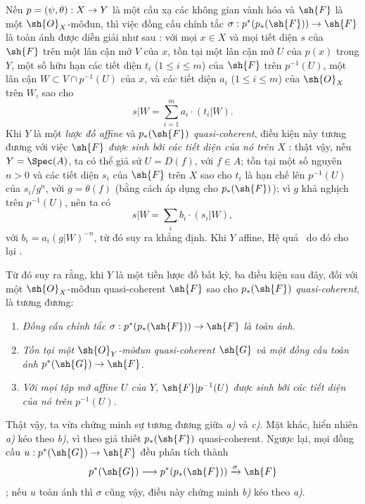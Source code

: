 \documentclass[oneside,10pt]{amsart}
\makeatletter
\renewcommand{\leq}{\leqslant}
\newcommand{\ega@arrow}[2]{\mathchoice{#1}{#2}{#2}{#2}}
\renewcommand{\to}{\ega@arrow{\longrightarrow}{\rightarrow}}
\newcommand{\oldpage}[2][]{\marginnote{\normalfont\footnotesize\textbf{#1}~|~#2}\ignorespaces}
\let\EGAOriginalLabel\label
\renewcommand{\label}[1]{\phantomsection\EGAOriginalLabel{#1}}
\makeatother
\begin{document}
\begin{remarks}[3.4.7]
\label{II.3.4.7}
Nếu $p=(\psi,\theta):X\to Y$ là một cấu xạ các không gian vành hóa và $\sh{F}$ là một $\sh{O}_X$-môđun, thì việc đồng cấu chính tắc $\sigma:p^*(p_*(\sh{F}))\to\sh{F}$ là toàn ánh được diễn giải như sau : với mọi $x\in X$ và mọi tiết diện $s$ của $\sh{F}$ trên một lân cận mở $V$ của $x$, tồn tại một lân cận mở $U$ của $p(x)$ trong $Y$, một số hữu hạn các tiết diện $t_i$ ($1\leq i\leq m$) của $\sh{F}$ trên $p^{-1}(U)$, một lân cận $W\subset V\cap p^{-1}(U)$ của $x$, và các tiết diện $a_i$ ($1\leq i\leq m$) của $\sh{O}_X$ trên $W$, sao cho
\[
  s|W=\sum_{i=1}^m a_i\cdot(t_i|W).
\]
Khi $Y$ là một \emph{lược đồ affine} và $p_*(\sh{F})$ \emph{quasi-coherent}, điều kiện này tương đương với việc $\sh{F}$ \emph{được sinh bởi các tiết diện của nó trên $X$} : thật vậy, nếu $Y=\Spec(A)$, ta có thể giả sử $U=D(f)$, với $f\in A$;
tồn tại một số nguyên $n>0$ và các tiết diện $s_i$ của $\sh{F}$ trên $X$ sao cho $t_i$ là hạn chế lên $p^{-1}(U)$ của $s_i/g^n$, với $g=\theta(f)$ (bằng cách áp dụng  cho $p_*(\sh{F})$);
vì $g$ khả nghịch trên $p^{-1}(U)$, nên ta có
\[
  s|W=\sum_i b_i\cdot(s_i|W),
\]
với $b_i=a_i(g|W)^{-n}$, từ đó suy ra khẳng định.
Khi $Y$ affine, Hệ quả~ do đó cho lại .

Từ đó suy ra rằng, khi $Y$ là một tiền lược đồ bất kỳ, ba điều kiện
\oldpage[II]{61}
sau đây, đối với một $\sh{O}_X$-môđun quasi-coherent $\sh{F}$ sao cho $p_*(\sh{F})$ \emph{quasi-coherent}, là tương đương:
\begin{enumerate}
  \item[a)] \emph{Đồng cấu chính tắc $\sigma:p^*(p_*(\sh{F}))\to\sh{F}$ là toàn ánh.}
  \item[b)] \emph{Tồn tại một $\sh{O}_Y$-môđun quasi-coherent $\sh{G}$ và một đồng cấu toàn ánh $p^*(\sh{G})\to\sh{F}$.}
  \item[c)] \emph{Với mọi tập mở affine $U$ của $Y$, $\sh{F}|p^{-1}(U)$ được sinh bởi các tiết diện của nó trên $p^{-1}(U)$.}
\end{enumerate}

Thật vậy, ta vừa chứng minh sự tương đương giữa \emph{a)} và \emph{c)}.
Mặt khác, hiển nhiên \emph{a)} kéo theo \emph{b)}, vì theo giả thiết $p_*(\sh{F})$ quasi-coherent.
Ngược lại, mọi đồng cấu $u:p^*(\sh{G})\to\sh{F}$ đều phân tích thành
\[
  p^*(\sh{G})\to p^*(p_*(\sh{F}))\xrightarrow{\sigma}\sh{F}
\]
; nếu $u$ toàn ánh thì $\sigma$ cũng vậy, điều này chứng minh \emph{b)} kéo theo \emph{a)}.
\end{remarks}
\end{document}
